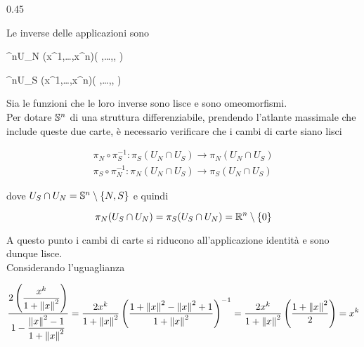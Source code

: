 	{0.45}{%
		}

Le inverse delle applicazioni sono

	{\R^{n}}{U_{N}}
	{(x^{1},\dots,x^{n})}{\left( ,\dots,, \right)}

	{\R^{n}}{U_{S}}
	{(x^{1},\dots,x^{n})}{\left( ,\dots,, \right)}

Sia le funzioni che le loro inverse sono lisce e sono omeomorfismi. \\
Per dotare $ \S^{n} $ di una struttura differenziabile, prendendo l'atlante massimale che include queste due carte, è necessario verificare che i cambi di carte siano lisci

\begin{gather}
	\pi_{N} \circ \pi_{S}^{-1} : \pi_{S}(U_{N} \cap U_{S}) \to \pi_{N}(U_{N} \cap U_{S}) \\
	\pi_{S} \circ \pi_{N}^{-1} : \pi_{N}(U_{N} \cap U_{S}) \to \pi_{S}(U_{N} \cap U_{S})
\end{gather}

dove $ U_{S} \cap U_{N} = \S^{n} \setminus \{N,S\} $ e quindi

\begin{equation}
	\pi_{N}(U_{S} \cap U_{N}) = \pi_{S}(U_{S} \cap U_{N}) = \R^{n} \setminus \{0\}
\end{equation}

A questo punto i cambi di carte si riducono all'applicazione identità e sono dunque lisce. \\
Considerando l'uguaglianza

\begin{equation}
	\dfrac{ 2 \left( \dfrac{x^{k}}{1 + \norm{x}^{2}} \right) }{ 1 - \dfrac{\norm{x}^{2} - 1}{1 + \norm{x}^{2}} } = \dfrac{2 x^{k}}{1 + \norm{x}^{2}} \left( \dfrac{ 1 + \norm{x}^{2} - \norm{x}^{2} + 1 }{ 1 + \norm{x}^{2} } \right)^{-1} %
	= \dfrac{2 x^{k}}{1 + \norm{x}^{2}} \left( \dfrac{1 + \norm{x}^{2}}{2} \right) %
	= x^{k}
\end{equation}

